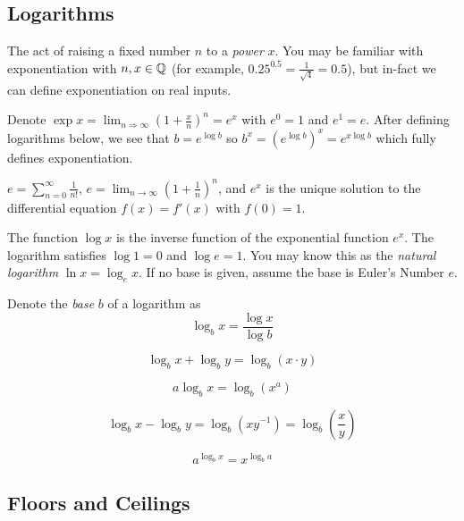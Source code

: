 \documentclass[main.tex]{subfiles}
\begin{document}
\subsection{Logarithms}

\begin{defn}
	The act of raising a fixed number \(n\) to a \textit{power} \(x\). You may be familiar with exponentiation with \(n,x \in \mathbb{Q}\) (for example, \(0.25^{0.5} = \frac{1}{\sqrt{4}} = 0.5\)), but in-fact we can define exponentiation on real inputs.
	
	Denote \(\exp x = \lim_{n \Rightarrow \infty} (1 + \frac{x}{n})^n = e^x\) with \(e^0 = 1\) and \(e^1 = e\). After defining logarithms below, we see that \(b = e^{\log b}\) so \(b^x = (e^{\log b})^x = e^{x \log b}\) which fully defines exponentiation.
\end{defn}

\(e = \sum_{n=0}^{\infty} \frac{1}{n!}\), \(e = \lim_{n \rightarrow \infty} (1 + \frac{1}{n})^n\), and \(e^x\) is the unique solution to the differential equation \(f(x) = f'(x)\) with \(f(0) = 1\).

\begin{defn}
	The function \(\log x\) is the inverse function of the exponential function \(e^x\). The logarithm satisfies \(\log 1 = 0\) and \(\log e = 1\). You may know this as the \textit{natural logarithm} \(\ln x = \log_e x\). If no base is given, assume the base is Euler's Number \(e\).
\end{defn}

Denote the \textit{base} \(b\) of a logarithm as \[\log_b x = \frac{\log x}{\log b}\]

\begin{prop}
	\[\log_b x + \log_b y = \log_b (x \cdot y)\]
\end{prop}

\begin{prop}
	\[a\log_b x = \log_b (x^a)\]
\end{prop}

\begin{prop}
	\[\log_b x - \log_b y = \log_b (xy^{-1}) = \log_b (\frac{x}{y})\]
\end{prop}

\begin{prop}
	\[a^{\log_b x} = x^{\log_b a}\]
\end{prop}

\subsection{Floors and Ceilings}
\end{document}

